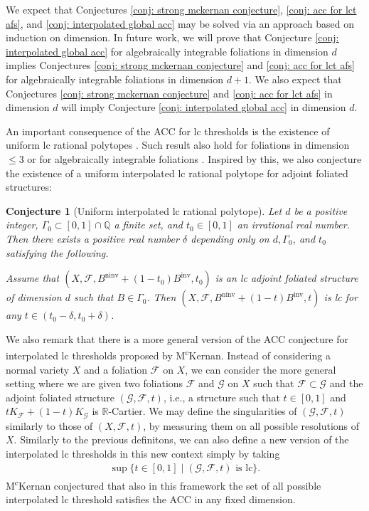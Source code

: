 \documentclass[12pt]{amsart}
\numberwithin{equation}{section}
\newcommand{\Rr}{\mathbb{R}}
\newcommand{\ninv}{\operatorname{ninv}}
\newcommand{\inv}{\operatorname{inv}}
\newcommand{\Ff}{\mathcal{F}}
\newcommand{\Gg}{\mathcal{G}}
\newcommand{\Ii}{\Gamma}
\newtheorem{conj}[thm]{Conjecture}
\theoremstyle{definition}
\theoremstyle{definition}
\theoremstyle{definition}
\begin{document}
We expect that Conjectures \ref{conj: strong mckernan conjecture}, \ref{conj: acc for lct afs}, and \ref{conj: interpolated global acc} may be solved via an approach based on induction on dimension. In future work, we will prove that Conjecture \ref{conj: interpolated global acc} for algebraically integrable foliations in dimension $d$ implies Conjectures \ref{conj: strong mckernan conjecture} and \ref{conj: acc for lct afs} for algebraically integrable foliations in dimension $d+1$. 
We also expect that Conjectures \ref{conj: strong mckernan conjecture} and \ref{conj: acc for lct afs} in dimension $d$ will imply Conjecture \ref{conj: interpolated global acc} in dimension $d$.

An important consequence of the ACC for lc thresholds is the existence of uniform lc rational polytopes \cite[Theorem 5.6]{HLS19}. Such result also hold for foliations in dimension $\leq 3$ \cite{LMX24a,LMX24c} or for algebraically integrable foliations \cite{DLM23}. Inspired by this, we also conjecture the existence of a uniform interpolated lc rational polytope for adjoint foliated structures:

\begin{conj}[Uniform interpolated lc rational polytope]
Let $d$ be a positive integer, $\Ii_0\subset [0,1]\cap\mathbb Q$ a finite set, and $t_0\in [0,1]$ an irrational real number. Then there exists a positive real number $\delta$ depending only on $d,\Ii_0$, and $t_0$ satisfying the following.

Assume that $(X,\Ff,B^{\ninv}+(1-t_0)B^{\inv},t_0)$ is an lc adjoint foliated structure of dimension $d$ such that $B\in\Ii_0$. Then $(X,\Ff,B^{\ninv}+(1-t)B^{\inv},t)$ is lc for any $t\in (t_0-\delta,t_0+\delta)$.
\end{conj}



\smallskip

We also remark that there is a more general version of the ACC conjecture for interpolated lc thresholds proposed by M\textsuperscript{c}Kernan. Instead of considering a normal variety $X$ and a foliation $\Ff$ on $X$, we can consider the more general setting where we are given two foliations $\Ff$ and $\Gg$ on $X$ such that $\Ff \subset \Gg$ and the adjoint foliated structure $(\Gg,\Ff,t)$, i.e., a structure such that $t \in [0,1]$ and $tK_{\Ff}+(1-t)K_{\Gg}$ is $\Rr$-Cartier. 
We may define the singularities of $(\Gg,\Ff,t)$ similarly to those of $(X,\Ff,t)$, by measuring them on all possible resolutions of $X$.
Similarly to the previous definitons, we can also define a new version of the interpolated lc thresholds in this new context simply by taking 
\begin{align*}
\sup\{t\in [0,1]\mid (\Gg,\Ff,t)\text{ is lc}\}.
\end{align*}
M\textsuperscript{c}Kernan conjectured that also in this framework the set of all possible interpolated lc threshold satisfies the ACC in any fixed dimension.
\end{document}

